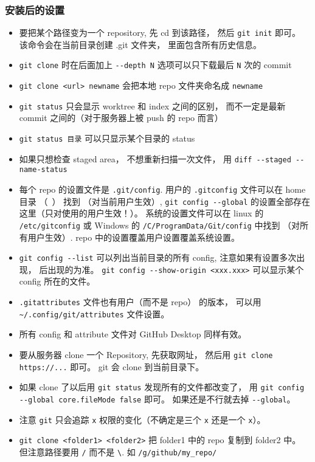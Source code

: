 \subsubsection{安装后的设置}
\begin{itemize}
\item 要把某个路径变为一个 repository, 先 cd 到该路径， 然后 \verb`git init` 即可。 该命令会在当前目录创建 .git 文件夹， 里面包含所有历史信息。
\item \verb`git clone` 时在后面加上 \verb`--depth N` 选项可以只下载最后 \verb`N` 次的 commit
\item \verb`git clone <url> newname` 会把本地 repo 文件夹命名成 \verb`newname`
\item \verb`git status` 只会显示 worktree 和 index 之间的区别， 而不一定是最新 commit 之间的（对于服务器上被 push 的 repo 而言）
\item \verb`git status 目录` 可以只显示某个目录的 status
\item 如果只想检查 staged area， 不想重新扫描一次文件， 用 \verb`diff --staged --name-status`
\item 每个 repo 的设置文件是 \verb`.git/config`. 用户的 \verb`.gitconfig` 文件可以在 home 目录 （~） 找到 （对当前用户生效）, \verb`git config --global` 的设置全部存在这里（只对使用的用户生效！）。 系统的设置文件可以在 linux 的 \verb`/etc/gitconfig` 或 Windows 的 \verb`/C/ProgramData/Git/config` 中找到 （对所有用户生效）. repo 中的设置覆盖用户设置覆盖系统设置。
\item \verb`git config --list` 可以列出当前目录的所有 config, 注意如果有设置多次出现， 后出现的为准。 \verb`git config --show-origin <xxx.xxx>` 可以显示某个 config 所在的文件。
\item \verb`.gitattributes` 文件也有用户（而不是 repo） 的版本， 可以用 \verb`~/.config/git/attributes` 文件设置。
\item 所有 config 和 attribute 文件对 GitHub Desktop 同样有效。
\item 要从服务器 clone 一个 Repository, 先获取网址， 然后用 \verb`git clone https://...` 即可。 git 会 clone 到当前目录下。
\item 如果 clone 了以后用 \verb`git status` 发现所有的文件都改变了， 用 \verb`git config --global core.fileMode false` 即可。 如果还是不行就去掉 \verb`--global`。
\item 注意 \verb`git` 只会追踪 \verb`x` 权限的变化（不确定是三个 \verb`x` 还是一个 \verb`x`）。
\item \verb`git clone <folder1> <folder2>` 把 folder1 中的 repo 复制到 folder2 中。 但注意路径要用 \verb`/` 而不是 \verb`\`. 如 \verb`/g/github/my_repo/`

\end{itemize}
